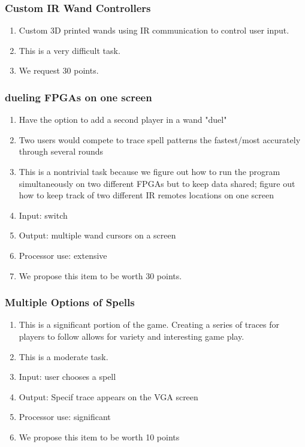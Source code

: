 \documentclass[letterpaper]{article} %
\begin{document}
\subsubsection{Custom IR Wand Controllers}
    \begin{enumerate}
        \item Custom 3D printed wands using IR communication to control user input.
        \item This is a very difficult task.
        \item We request 30 points.
    \end{enumerate}
    
\subsubsection{dueling FPGAs on one screen}
\begin{enumerate}
    \item Have the option to add a second player in a wand "duel"
    \item Two users would compete to trace spell patterns the fastest/most accurately through several rounds
    \item This is a nontrivial task because we figure out how to run the program simultaneously on two different FPGAs but to keep data shared; figure out how to keep track of two different IR remotes locations on one screen
    \item Input: switch
    \item Output: multiple wand cursors on a screen
    \item Processor use: extensive
    \item We propose this item to be worth 30 points.
\end{enumerate}

\subsubsection{Multiple Options of Spells}
    \begin{enumerate}
        \item This is a significant portion of the game. Creating a series of traces for players to follow allows for variety and interesting game play.
        \item This is a moderate task.
        \item Input: user chooses a spell
        \item Output: Specif trace appears on the VGA screen
        \item Processor use: significant
        \item We propose this item to be worth 10 points
    \end{enumerate}
    
\end{document}

